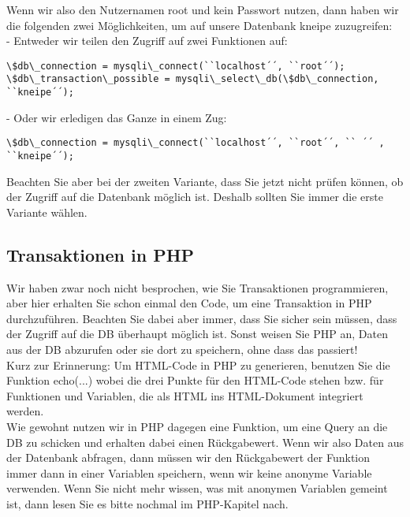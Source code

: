Wenn wir also den Nutzernamen root und kein Passwort nutzen, dann haben wir die folgenden zwei Möglichkeiten, um auf unsere Datenbank kneipe zuzugreifen:\\


-	Entweder wir teilen den Zugriff auf zwei Funktionen auf:

\begin{verbatim}
\$db\_connection = mysqli\_connect(``localhost´´, ``root´´);
\$db\_transaction\_possible = mysqli\_select\_db(\$db\_connection, ``kneipe´´);
\end{verbatim}

-	Oder wir erledigen das Ganze in einem Zug:

\begin{verbatim}
\$db\_connection = mysqli\_connect(``localhost´´, ``root´´, `` ´´ , ``kneipe´´);
\end{verbatim}

Beachten Sie aber bei der zweiten Variante, dass Sie jetzt nicht prüfen können, ob der Zugriff auf die Datenbank möglich ist. Deshalb sollten Sie immer die erste Variante wählen.

\subsection{Transaktionen in PHP}

Wir haben zwar noch nicht besprochen, wie Sie Transaktionen programmieren, aber hier erhalten Sie schon einmal den Code, um eine Transaktion in PHP durchzuführen. Beachten Sie dabei aber immer, dass Sie sicher sein müssen, dass der Zugriff auf die DB überhaupt möglich ist. Sonst weisen Sie PHP an, Daten aus der DB abzurufen oder sie dort zu speichern, ohne dass das passiert!\\

Kurz zur Erinnerung: Um HTML-Code in PHP zu generieren, benutzen Sie die Funktion echo(...) wobei die drei Punkte für den HTML-Code stehen bzw. für Funktionen und Variablen, die als HTML ins HTML-Dokument integriert werden.\\

Wie gewohnt nutzen wir in PHP dagegen eine Funktion, um eine Query an die DB zu schicken und erhalten dabei einen Rückgabewert. Wenn wir also Daten aus der Datenbank abfragen, dann müssen wir den Rückgabewert der Funktion immer dann in einer Variablen speichern, wenn wir keine anonyme Variable verwenden. Wenn Sie nicht mehr wissen, was mit anonymen Variablen gemeint ist, dann lesen Sie es bitte nochmal im PHP-Kapitel nach.\\


